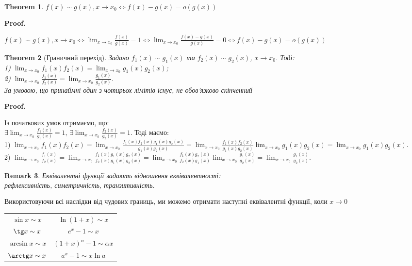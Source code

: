 \documentclass[a4paper, 14pt]{article}
\makeatletter
\def\qed{$\blacksquare$}
\theoremstyle{theoremdd}
\newtheorem{theorem}{Theorem}[subsection]
\theoremstyle{theoremdd}
\theoremstyle{theoremdd}
\theoremstyle{theoremdd}
\theoremstyle{theoremdd}
\theoremstyle{theoremdd}
\newtheorem{remark}[theorem]{Remark}
\theoremstyle{theoremdd}
\theoremstyle{theoremdd}
\renewenvironment{proof}[1][Proof.\\]{\par
\pushQED{\hfill \qed}%
\normalfont \topsep6\p@\@plus6\p@\relax
\trivlist
\item\relax
{\bfseries
#1\@addpunct{.}}\hspace\labelsep\ignorespaces
}{%
\popQED\endtrivlist\@endpefalse
}
\makeatother
\begin{document}
\begin{theorem}
$f(x) \sim g(x), x \to x_0 \iff f(x)-g(x) = o(g(x))$
\end{theorem}

\begin{proof}
$f(x) \sim g(x), x \to x_0 \iff \displaystyle \lim_{x \to x_0} \frac{f(x)}{g(x)} = 1 \iff \lim_{x \to x_0} \frac{f(x)-g(x)}{g(x)} = 0 \iff f(x)-g(x) = o(g(x))$
\end{proof}

\begin{theorem}[Граничний перехід]
Задано $f_1(x) \sim g_1(x)$ та $f_2(x) \sim g_2(x)$, $x \to x_0$. Тоді:\\
1) $\displaystyle \lim_{x \to x_0} f_1(x) f_2(x) = \lim_{x \to x_0} g_1(x) g_2(x)$;\\
2) $\displaystyle \lim_{x \to x_0} \frac{f_1(x)}{f_2(x)} = \lim_{x \to x_0} \frac{g_1(x)}{g_2(x)}$.\\
За умовою, що принаймні один з чотирьох лімітів існує, не обов'язково скінченний
\end{theorem}

\begin{proof}
Із початкових умов отримаємо, що:\\
$\displaystyle \exists \lim_{x \to x_0} \frac{f_1(x)}{g_1(x)} = 1$, $\displaystyle \exists \lim_{x \to x_0} \frac{f_2(x)}{g_2(x)} = 1$. Тоді маємо:\\
1) $\displaystyle \lim_{x \to x_0} f_1(x) f_2(x) = \lim_{x \to x_0} \frac{f_1(x) f_2(x) g_1(x) g_2(x)}{g_1(x) g_2(x)} = \lim_{x \to x_0} \frac{f_1(x) f_2(x)}{g_1(x) g_2(x)} \lim_{x \to x_0} g_1(x) g_2(x) = \lim_{x \to x_0} g_1(x) g_2(x)$.\\
2) $\displaystyle \lim_{x \to x_0} \frac{f_1(x)}{f_2(x)} = \lim_{x \to x_0} \frac{f_1(x)g_1(x)g_2(x)}{f_2(x)g_1(x)g_2(x)} = \lim_{x \to x_0} \frac{f_1(x)g_2(x)}{f_2(x)g_1(x)} \lim_{x \to x_0} \frac{g_1(x)}{g_2(x)} = \lim_{x \to x_0} \frac{g_1(x)}{g_2(x)}$.
\end{proof}

\begin{remark}
Еквівалентні функції задають відношення еквівалентності: \\
рефлексивність, симетричність, транзитивність.
\end{remark}

Використовуючи всі наслідки від чудових границь, ми можемо отримати наступні еквівалентні функції, коли $x \to 0$
\begin{center}
\begin{tabular}{ c c }
 $\sin x \sim x$ & $\ln(1+x) \sim x$ \\ 
 $\tg x \sim x$ & $e^x - 1 \sim x$ \\
 $\arcsin x \sim x$ & $(1+x)^\alpha - 1 \sim \alpha x$ \\
 $\arctg x \sim x$ & $a^x - 1 \sim x \ln a$ \\ 
\end{tabular}
\end{center}
\end{document}
